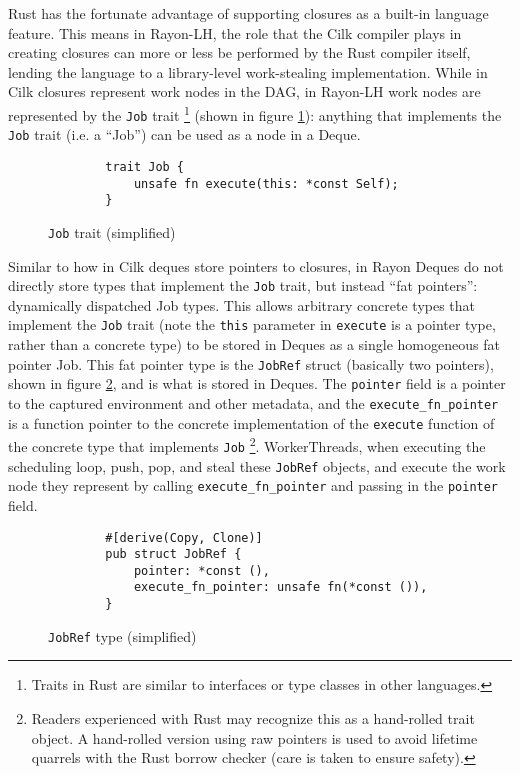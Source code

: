 \documentclass[bsc,frontabs,singlespacing,parskip,deptreport,normalheadings]{infthesis}
\begin{document}
Rust has the fortunate advantage of supporting closures as a built-in language
feature. This means in Rayon-LH, the role that the Cilk compiler plays in
creating closures can more or less be performed by the Rust compiler itself,
lending the language to a library-level work-stealing implementation. While in
Cilk closures represent work nodes in the DAG, in Rayon-LH work nodes are
represented by the \texttt{Job} trait \footnote{Traits in Rust are similar to
interfaces or type classes in other languages.} (shown in figure
\ref{fig:job_trait}): anything that implements the \texttt{Job} trait (i.e. a
``Job'') can be used as a node in a Deque.

\begin{figure}[ht]
    \begin{verbatim}
        trait Job {
            unsafe fn execute(this: *const Self);
        }
    \end{verbatim}
    \caption{\texttt{Job} trait (simplified)}
    \label{fig:job_trait}
\end{figure}

Similar to how in Cilk deques store pointers to closures, in Rayon Deques do not
directly store types that implement the \texttt{Job} trait, but instead ``fat
pointers'': dynamically dispatched Job types. This allows arbitrary concrete
types that implement the \texttt{Job} trait (note the \texttt{this} parameter in
\texttt{execute} is a pointer type, rather than a concrete type) to be stored in
Deques as a single homogeneous fat pointer Job. This fat pointer type is the
\texttt{JobRef} struct (basically two pointers), shown in figure
\ref{fig:job_ref}, and is what is stored in Deques. The \texttt{pointer} field
is a pointer to the captured environment and other metadata, and the
\texttt{execute\_fn\_pointer} is a function pointer to the concrete
implementation of the \texttt{execute} function of the concrete type that
implements \texttt{Job} \footnote{Readers experienced with Rust may recognize
    this as a hand-rolled trait object. A hand-rolled version using raw pointers
is used to avoid lifetime quarrels with the Rust borrow checker (care is taken
to ensure safety).}. WorkerThreads, when executing the scheduling loop, push,
pop, and steal these \texttt{JobRef} objects, and execute the work node they
represent by calling \texttt{execute\_fn\_pointer} and passing in the
\texttt{pointer} field.

\begin{figure}[ht]
    \begin{verbatim}
        #[derive(Copy, Clone)]
        pub struct JobRef {
            pointer: *const (),
            execute_fn_pointer: unsafe fn(*const ()),
        }
    \end{verbatim}
    \caption{\texttt{JobRef} type (simplified)}
    \label{fig:job_ref}
\end{figure}
\end{document}
